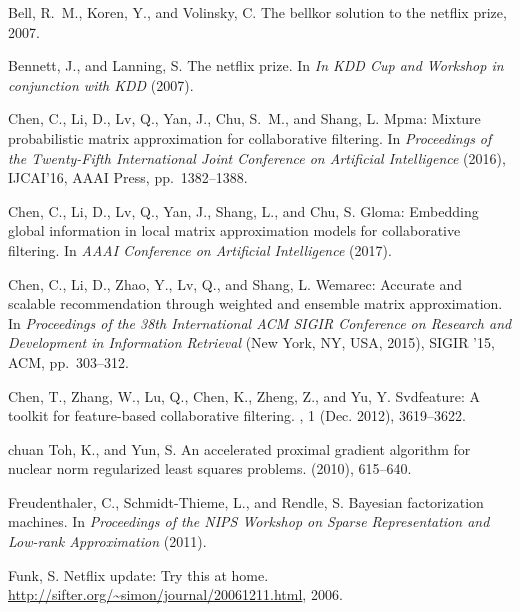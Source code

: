 \documentclass{article}
\begin{document}
\begin{thebibliography}{10}

{\sc Bell, R.~M., Koren, Y., and Volinsky, C.}
\newblock The bellkor solution to the netflix prize, 2007.

{\sc Bennett, J., and Lanning, S.}
\newblock The netflix prize.
\newblock In {\em In KDD Cup and Workshop in conjunction with KDD\/} (2007).

{\sc Chen, C., Li, D., Lv, Q., Yan, J., Chu, S.~M., and Shang, L.}
\newblock Mpma: Mixture probabilistic matrix approximation for collaborative
  filtering.
\newblock In {\em Proceedings of the Twenty-Fifth International Joint
  Conference on Artificial Intelligence\/} (2016), IJCAI'16, AAAI Press,
  pp.~1382--1388.

{\sc Chen, C., Li, D., Lv, Q., Yan, J., Shang, L., and Chu, S.}
\newblock Gloma: Embedding global information in local matrix approximation
  models for collaborative filtering.
\newblock In {\em AAAI Conference on Artificial Intelligence\/} (2017).

{\sc Chen, C., Li, D., Zhao, Y., Lv, Q., and Shang, L.}
\newblock Wemarec: Accurate and scalable recommendation through weighted and
  ensemble matrix approximation.
\newblock In {\em Proceedings of the 38th International ACM SIGIR Conference on
  Research and Development in Information Retrieval\/} (New York, NY, USA,
  2015), SIGIR '15, ACM, pp.~303--312.

{\sc Chen, T., Zhang, W., Lu, Q., Chen, K., Zheng, Z., and Yu, Y.}
\newblock Svdfeature: A toolkit for feature-based collaborative filtering.
, 1 (Dec. 2012), 3619--3622.

{\sc chuan Toh, K., and Yun, S.}
\newblock An accelerated proximal gradient algorithm for nuclear norm
  regularized least squares problems.
 (2010), 615--640.

{\sc Freudenthaler, C., Schmidt-Thieme, L., and Rendle, S.}
\newblock Bayesian factorization machines.
\newblock In {\em Proceedings of the NIPS Workshop on Sparse Representation and
  Low-rank Approximation\/} (2011).

{\sc Funk, S.}
\newblock Netflix update: Try this at home.
\newblock \url{http://sifter.org/~simon/journal/20061211.html}, 2006.


\end{thebibliography}
\end{document}
